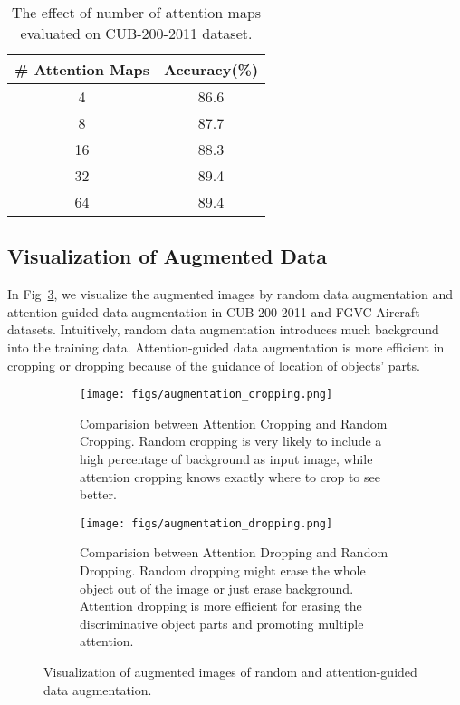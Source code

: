 \documentclass[10pt,twocolumn,letterpaper]{article}
\begin{document}
\begin{table}[h]
    \begin{center}
        \scriptsize
        \begin{tabular}{c|c}
            \hline
            \# Attention Maps & Accuracy(\%)\\
            \hline
            4 & 86.6 \\
            8 & 87.7 \\
            16 & 88.3 \\
            32 & 89.4 \\
            64  & 89.4 \\
            \hline
        \end{tabular}
    \end{center}
    \caption {The effect of number of attention maps evaluated on CUB-200-2011 dataset. }
    \label{tab:num_parts}
\end{table}








\subsection{Visualization of Augmented Data}
In Fig~\ref{fig:augmented_data}, we visualize the augmented images by random data augmentation and attention-guided data augmentation in CUB-200-2011 and FGVC-Aircraft datasets. Intuitively, random data augmentation introduces much background into the training data. Attention-guided data augmentation is more efficient in cropping or dropping because of the guidance of location of objects' parts.

\begin{figure}[h]
    \centering
    \begin{subfigure}{0.5\textwidth}
        \centering
        \texttt{[image: figs/augmentation\_cropping.png]}
        \caption{Comparision between Attention Cropping and Random Cropping. Random cropping is very likely to include a high percentage of background as input image, while attention cropping knows exactly where to crop to see better.}
        \label{fig:dan}
    \end{subfigure}

    \begin{subfigure}{0.5\textwidth}
        \centering
        \texttt{[image: figs/augmentation\_dropping.png]}
        \caption{Comparision between Attention Dropping and Random Dropping. Random dropping might erase the whole object out of the image or just erase background. Attention dropping is more efficient for erasing the discriminative object parts and promoting multiple attention.}
        \label{fig:ws_dan}
    \end{subfigure}
    \caption{Visualization of augmented images of random and attention-guided data augmentation.}
    \label{fig:augmented_data}
\end{figure}
\end{document}
